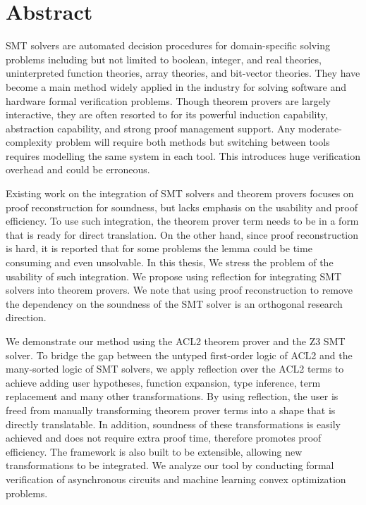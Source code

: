 
\chapter{Abstract}

\ac{SMT} solvers are automated decision procedures for domain-specific solving
problems including but not limited to boolean, integer, and real theories,
uninterpreted function theories, array theories, and bit-vector theories.
They have become a main method widely applied in the industry for solving
software and hardware formal verification problems.
Though theorem provers are largely interactive, they are often resorted to for
its powerful induction capability, abstraction capability, and strong proof
management support.
Any moderate-complexity problem will require both methods but switching between
tools requires modelling the same system in each tool.
This introduces huge verification overhead and could be erroneous.

Existing work on the integration of \acs{SMT} solvers and theorem provers
focuses on proof reconstruction for soundness, but lacks emphasis on the
usability and proof efficiency.
To use such integration, the theorem prover term needs to be in a form that is
ready for direct translation.
On the other hand, since proof reconstruction is hard, it is reported that for
some problems the lemma could be time consuming and even unsolvable.
In this thesis, We stress the problem of the usability of such integration.
We propose using reflection for integrating \acs{SMT} solvers into theorem
provers. 
We note that using proof reconstruction to remove the dependency on the
soundness of the \acs{SMT} solver is an orthogonal research direction.

We demonstrate our method using the ACL2 theorem prover and the Z3
\acs{SMT} solver.
To bridge the gap between the untyped first-order logic of ACL2 and the
many-sorted logic of \acs{SMT} solvers, we apply reflection over the ACL2
terms to achieve adding user hypotheses, function expansion, type inference,
term replacement and many other transformations.
By using reflection, the user is freed from manually transforming theorem prover
terms into a shape that is directly translatable.
In addition, soundness of these transformations is easily achieved and does not
require extra proof time, therefore promotes proof efficiency.
The framework is also built to be extensible, allowing new transformations to be
integrated.
We analyze our tool by conducting formal verification of asynchronous circuits
and machine learning convex optimization problems.

